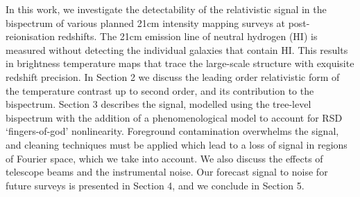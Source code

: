 { In this work, we investigate the detectability of the relativistic signal in the bispectrum of various planned 21cm intensity mapping surveys at post-reionisation redshifts. 
The 21cm emission line of neutral hydrogen (HI) is measured without detecting the individual galaxies that contain HI. This results in brightness temperature maps that trace the large-scale structure with exquisite redshift precision. In Section 2 we discuss the leading order relativistic form of the temperature contrast up to second order, and its contribution to the bispectrum. Section 3 describes the signal, modelled using the tree-level bispectrum with the addition of a phenomenological model to account for RSD `fingers-of-god' nonlinearity.
Foreground contamination overwhelms the signal, and cleaning techniques must be applied which lead to a loss of signal in regions of Fourier space, which we take into account. We also discuss the effects of telescope beams and the instrumental noise. Our forecast signal to noise for future surveys is presented in Section 4, and we conclude in Section 5.}
%
%
%
%
